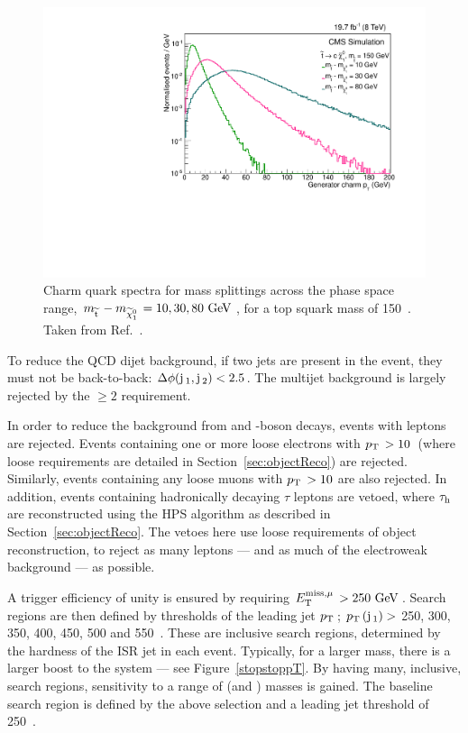 \begin{figure}%
  \begin{center}
  \includegraphics[scale=0.45]{Figures/sus13009/charmpt.pdf}
  \caption{Charm quark \pt spectra for mass splittings across the phase space range, $m_{\widetilde{{\rm t}}\,}-m_{\widetilde{\chi}^{0}_{1}\,}=10, 30, 80~\mathrm{GeV}\,$, for a top squark mass of 150~\GeV. Taken from Ref.~\cite{sus14001}.
         \label{stopj2pT}}
  \end{center}
\end{figure}

To reduce the \ac{QCD} dijet background, if two jets are present in the event, they must not be back-to-back: 
$\Delta \phi ({\rm j}\,_1,{\rm j}\,_2) < 2.5$. 
The multijet background is largely rejected by the \njets$\ge2$ requirement.


In order to reduce the background from \Z{} and \W-boson decays, events
with leptons are rejected.
Events containing one or more loose electrons with $p_{\text{T}}\, > 10$~\GeV (where loose requirements are detailed in Section~\ref{sec:objectReco}) are rejected. 
Similarly, events containing any loose muons with $p_{\text{T}}\, > 10$ \GeV are also rejected. 
In addition, events containing hadronically decaying $\tau$ leptons are vetoed, where $\tau_\mathrm{h}\,$ are reconstructed using the \ac{HPS} algorithm as described in Section~\ref{sec:objectReco}.
The vetoes here use loose requirements of object reconstruction, to reject as many leptons --- and as much of the electroweak background --- as possible.

A trigger efficiency of unity is ensured by requiring $E^{\rm miss, \mu}_{\rm T}\,>250~\mathrm{GeV}\,$. Search regions are then defined by thresholds of the leading jet $p_{\text{T}}\,$; $p_{\text{T}}\,({\rm j}\,_{1}) >$ 250, 300, 350, 400, 450, 500 and 550~\GeV.
These are inclusive search regions, determined by the hardness of the \ac{ISR} jet in each event.
Typically, for a larger \sTop mass, there is a larger boost to the \sTop\santiTop{} system --- see Figure~\ref{stopstoppT}. 
By having many, inclusive, search regions, sensitivity to a range of \sTop (and \sBot) masses is gained.  
The baseline search region is defined by the above selection and a leading jet threshold of 250~\GeV.

